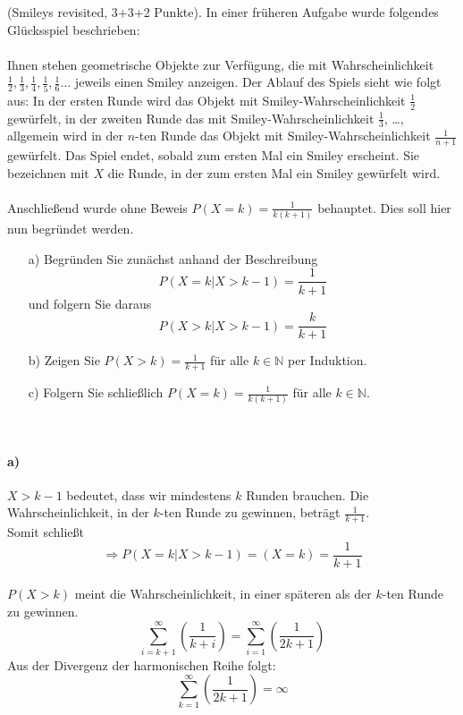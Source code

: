 \documentclass[twoside]{article}
\begin{document}
(Smileys revisited, 3+3+2 Punkte).
In einer früheren Aufgabe wurde folgendes Glücksspiel beschrieben:\\
\vspace{.1cm}\\
Ihnen stehen geometrische Objekte zur Verfügung, die mit Wahrscheinlichkeit $\frac{1}{2},\frac{1}{3},\frac{1}{4},\frac{1}{5},\frac{1}{6}\dots$ jeweils einen Smiley anzeigen.
Der Ablauf des Spiels sieht wie folgt aus: In der ersten Runde wird das Objekt mit Smiley-Wahrscheinlichkeit $\frac{1}{2}$ gewürfelt, in der zweiten Runde das mit Smiley-Wahrscheinlichkeit $\frac{1}{3}$, \dots, allgemein wird in der $n$-ten Runde das Objekt mit Smiley-Wahrscheinlichkeit $\frac{1}{n+1}$ gewürfelt.
Das Spiel endet, sobald zum ersten Mal ein Smiley erscheint.
Sie bezeichnen mit $X$ die Runde, in der zum ersten Mal ein Smiley gewürfelt wird.\\
\vspace{.1cm}\\
Anschließend wurde ohne Beweis $P(X=k)=\frac{1}{k(k+1)}$ behauptet.
Dies soll hier nun begründet werden.
\begin{enumerate}
	\item[a)] Begründen Sie zunächst anhand der Beschreibung
	\[
		P(X=k | X > k-1)=\frac{1}{k+1}
	\]
	und folgern Sie daraus
	\[
		P(X > k | X > k-1) = \frac{k}{k+1}
	\]
	\item[b)] Zeigen Sie $P(X>k)=\frac{1}{k+1}$ für alle $k \in \mathbb{N}$ per Induktion.
	\item[c)] Folgern Sie schließlich $P(X=k)=\frac{1}{k(k+1)}$ für alle $k \in \mathbb{N}$.
\end{enumerate}
\vspace{.3cm}\-\\
\paragraph{a)}
$X>k-1$ bedeutet, dass wir mindestens $k$ Runden brauchen.
Die Wahrscheinlichkeit, in der $k$-ten Runde zu gewinnen, beträgt $\frac{1}{k+1}$.\\
Somit schließt 
\[
	\Rightarrow P(X=k | X > k-1)=(X=k)=\frac{1}{k+1}
\]
\\
$P(X>k)$ meint die Wahrscheinlichkeit, in einer späteren als der $k$-ten Runde zu gewinnen.
\[
	\sum_{i=k + 1}^{\infty} \left(\frac{1}{k+i}\right) = \sum_{i=1}^{\infty}\left(\frac{1}{2k+1}\right)
\]
Aus der Divergenz der harmonischen Reihe folgt:
\[
	\sum_{k=1}^{\infty} \left(\frac{1}{2k+1}\right)=\infty
\]
\end{document}
